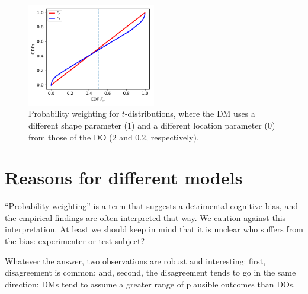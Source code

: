 \documentclass[a4paper, 12pt]{article}
\newcommand{\flabel}[1]{\label{fig:#1}}
\newcommand{\seclabel}[1]{\label{sec:#1}}
\newcommand{\ND}{\mathcal{N}} %
\begin{document}
\begin{figure}[htb]
\centering
\includegraphics[width=0.5\textwidth]{./figs/Student-t.pdf}
\caption{Probability weighting for $t$-distributions, where the DM uses a different shape parameter (1) and a different location parameter (0) from those of the DO (2 and 0.2, respectively).}
\flabel{fat_tailed_CDF}
\end{figure}



\FloatBarrier
\section{Reasons for different models\seclabel{Reasons_for}}
``Probability weighting'' is a term that suggests a detrimental cognitive bias, and the empirical findings are often interpreted that way. We caution against this interpretation. At least we should keep in mind that it is unclear who suffers from the bias: experimenter or test subject? 

Whatever the answer, two observations are robust and interesting: first, disagreement is common; and, second, the disagreement tends to go in the same direction: DMs tend to assume a greater range of plausible outcomes than DOs. 

\end{document}
